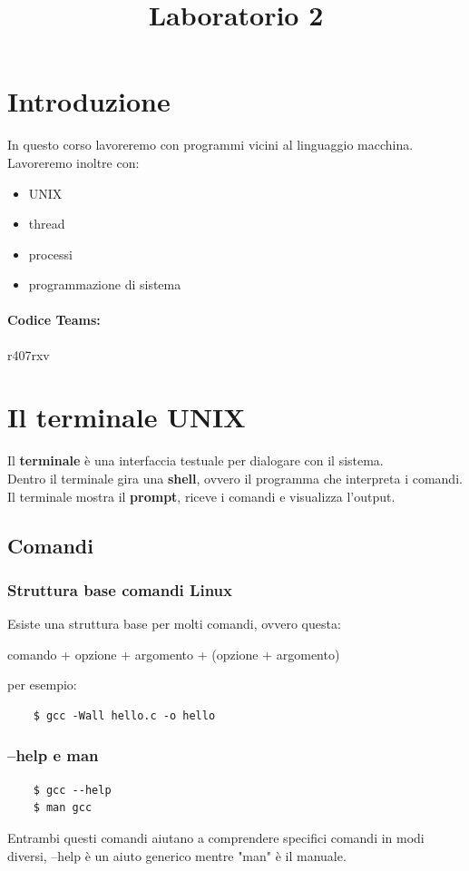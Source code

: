 \documentclass[12pt,a4paper]{article}
\title{Laboratorio 2}
\author{}
\date{}
\let\oldsection\section
\renewcommand{\section}{\clearpage\oldsection}
\begin{document}
\maketitle
\tableofcontents

\section{Introduzione}
In questo corso lavoreremo con programmi vicini al linguaggio macchina.\\
Lavoreremo inoltre con:
\begin{itemize}
    \item UNIX
    \item thread
    \item processi
    \item programmazione di sistema 
\end{itemize}
\paragraph{Codice Teams:} r407rxv

\section{Il terminale UNIX}
Il \textbf{terminale} è una interfaccia testuale per dialogare con il sistema.\\
Dentro il terminale gira una \textbf{shell}, ovvero il programma che interpreta i comandi.\\
Il terminale mostra il \textbf{prompt}, riceve i comandi e visualizza l'output.
\subsection{Comandi}
\subsubsection{Struttura base comandi Linux}
Esiste una struttura base per molti comandi, ovvero questa:
\begin{center}
    comando + opzione + argomento + (opzione + argomento)
\end{center}
per esempio:
\begin{lstlisting}
    $ gcc -Wall hello.c -o hello
\end{lstlisting}
\subsubsection{--help e man}
\begin{lstlisting}
    $ gcc --help
    $ man gcc
\end{lstlisting}
Entrambi questi comandi aiutano a comprendere specifici comandi in modi diversi, --help è un aiuto generico mentre "man" è il manuale.
\end{document}
